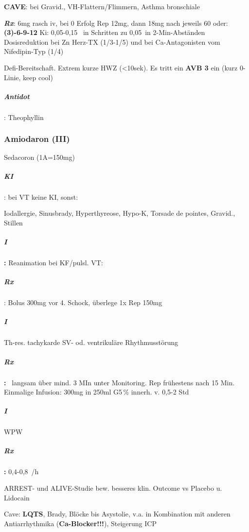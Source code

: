{\color[rgb]{0.8627451,0.13725491,0.0}
\textbf{CAVE}: bei Gravid., VH-Flattern/Flimmern, Asthma bronschiale}

{\color[rgb]{0.5019608,0.0,0.5019608}
\textbf{\textit{Rx}}: 6mg rasch iv, bei 0 Erfolg Rep 12mg, dann 18mg
nach jeweils 60{\textquotesingle}{\textquotesingle}\newline
oder: \textbf{(3)-6-9-12} \newline
Ki: 0,05-0,15 \, in Schritten zu 0,05\, in
2-Min-Abständen\newline
Dosisreduktion bei Zn Herz-TX (1/3-1/5) und bei Ca-Antagonisten vom
Nifedipin-Typ (1/4) }


Defi-Bereitschaft. Extrem kurze HWZ ({\textless}10sek). Es tritt ein
\textbf{AVB 3{\textdegree}} ein (kurz 0-Linie, keep cool)

\subparagraph{Antidot}: Theophyllin





\subsubsection{Amiodaron (\textrm{III})}

Sedacoron (1A=150mg)

\subparagraph{KI}: bei VT keine KI, sonst:

Iodallergie, Sinusbrady, Hyperthyreose, Hypo-K, Torsade de pointes,
Gravid., Stillen

\subparagraph{I}\textbf{: }Reanimation bei KF/pulsl. VT:

\subparagraph{Rx}: Bolus 300mg vor 4. Schock, überlege 1x Rep
150mg

\subparagraph{I} Th-res. tachykarde SV- od. ventrikuläre
Rhythmusstörung

\subparagraph{Rx}\textbf{: }\, langsam über mind. 3 MIn unter
Monitoring. Rep frühestens nach 15 Min.\newline
Einmalige Infusion: 300mg in 250ml G5\,\% innerh. v. 0,5-2 Std


\subparagraph{I} WPW

\subparagraph{Rx}\textbf{: }0,4-0,8 \,/h

ARREST- und ALIVE-Studie bew. besseres klin. Outcome vs Placebo u.
Lidocain

Cave: \textbf{LQTS}, Brady, Blöcke bis Asystolie, v.a. in Kombination
mit anderen Antiarrhythmika (\textbf{Ca-Blocker!!!}), Steigerung ICP


